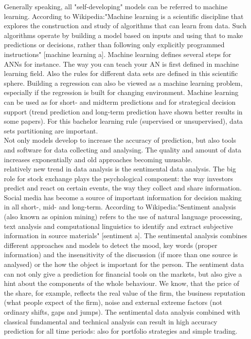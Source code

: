 \documentclass {article}
\begin{document}
Generally speaking, all "self-developing" models can be referred to machine learning. According to Wikipedia:"Machine learning is a scientific discipline that explores the construction and study of algorithms that can learn from data. Such algorithms operate by building a model based on inputs and using that to make predictions or decisions, rather than following only explicitly programmed instructions" [machine learning a]. Machine learning defines several steps for ANNs for instance. The way you can teach your AN is first defined in machine learning field. Also the rules for different data sets are defined in this scientific sphere. Building a regression can also be viewed as a machine learning problem, especially if the regression is built for changing environment. Machine learning can be used as for short- and midterm predictions and for strategical decision support (trend prediction and long-term prediction have shown better results in some papers). For this bachelor learning rule (supervised or unsupervised), data sets partitioning are important.  \\
Not only models develop to increase the accuracy of prediction, but also tools and software for data collecting and analysing. The quality and amount of data increases exponentially and old approaches becoming unusable.\\
relatively new trend in data analysis is the sentimental data analysis. The big role for stock exchange plays the psychological component: the way investors predict and react on certain events, the way they collect and share information. Social media has become a source of important information for decision making in all short-, mid- and long-term. According to Wikipedia:"Sentiment analysis (also known as opinion mining) refers to the use of natural language processing, text analysis and computational linguistics to identify and extract subjective information in source materials" [sentiment a]. The sentimental analysis combines different approaches and models to detect the mood, key words (proper information) and the insensitivity of the discussion (if more than one source is analysed) or the how the object is important for the person. The sentiment data can not only give a prediction for financial tools on the markets, but also give a hint about the components of the whole behaviour. We know, that the price of the share, for example, reflects the real value of the firm, the business reputation (what people expect of the firm), noise and external extreme factors (not ordinary shifts, gaps and jumps). The sentimental data analysis combined with classical fundamental and technical analysis can result in high accuracy prediction for all time periods: also for portfolio strategies and simple trading.
\end{document}
